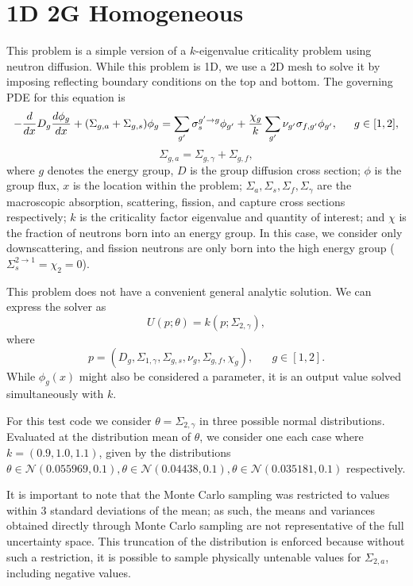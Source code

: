 \section{1D 2G Homogeneous}
This problem is a simple version of a $k$-eigenvalue criticality problem using neutron diffusion.  While this problem is 1D, we use a 2D mesh to solve it by imposing reflecting boundary conditions on the top and bottom.  The governing PDE for this equation is
\begin{equation}
-\frac{d }{d x}D_g\frac{d \phi_g}{d x}+(\Sigma_{g,a}+\Sigma_{g,s})\phi_g = \sum_{g'}\sigma_{s}^{g'\to g}\phi_{g'} + \frac{\chi_{g}}{k}\sum_{g'}\nu_{g'}\sigma_{f,g'}\phi_{g'},\hspace{15pt} g\in[1,2],
\end{equation}
\begin{equation}
\Sigma_{g,a}=\Sigma_{g,\gamma}+\Sigma_{g,f},
\end{equation}
where $g$ denotes the energy group, $D$ is the group diffusion cross section; $\phi$ is the group flux, $x$ is the location within the problem; $\Sigma_a,\Sigma_s,\Sigma_f,\Sigma_\gamma$ are the macroscopic absorption, scattering, fission, and capture cross sections respectively; $k$ is the criticality factor eigenvalue and quantity of interest; and $\chi$ is the fraction of neutrons born into an energy group.  In this case, we consider only downscattering, and fission neutrons are only born into the high energy group ($\Sigma_s^{2\to1}=\chi_2=0$).

This problem does not have a convenient general analytic solution.  We can express the solver as
\begin{equation}
U(p;\theta) = k(p;\Sigma_{2,\gamma}),
\end{equation}
where
\begin{equation}
p=(D_g,\Sigma_{1,\gamma},\Sigma_{g,s},\nu_g,\Sigma_{g,f},\chi_g),\hspace{20pt}g\in[1,2].
\end{equation}
While $\phi_g(x)$ might also be considered a parameter, it is an output value solved simultaneously with $k$.

For this test code we consider $\theta=\Sigma_{2,\gamma}$ in three possible normal distributions.  Evaluated at the distribution mean of $\theta$, we consider one each case where $k=(0.9,1.0,1.1)$, given by the distributions $\theta\in\mathcal{N}(0.055969,0.1), \theta\in\mathcal{N}(0.04438,0.1), \theta\in\mathcal{N}(0.035181,0.1)$ respectively.  

It is important to note that the Monte Carlo sampling was restricted to values within 3 standard deviations of the mean; as such, the means and variances obtained directly through Monte Carlo sampling are not representative of the full uncertainty space.  This truncation of the distribution is enforced because without such a restriction, it is possible to sample physically untenable values for $\Sigma_{2,a}$, including negative values.


